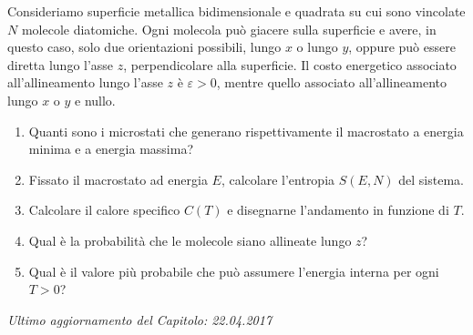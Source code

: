 \begin{Exercise}[title={Particelle diatomiche},label={ex:04-diatom}]
 Consideriamo superficie metallica bidimensionale e quadrata su cui sono vincolate $N$ molecole diatomiche. Ogni molecola può giacere sulla superficie e avere, in questo caso, solo due orientazioni possibili, lungo $x$ o lungo $y$, oppure può essere diretta lungo l'asse $z$, perpendicolare alla superficie. Il costo energetico associato all'allineamento lungo l'asse $z$ è $\varepsilon > 0$,  mentre quello associato all'allineamento lungo $x$ o $y$ e nullo.
\begin{enumerate}
	\item Quanti sono i microstati che generano rispettivamente il macrostato a energia minima e a energia massima?
	\item  Fissato il macrostato ad energia $E$, calcolare l'entropia $S(E, N )$ del sistema.
	\item Calcolare il calore specifico $C(T )$ e disegnarne l'andamento in funzione di $T$.
	\item Qual è la probabilità che le molecole siano allineate lungo $z$?
	\item Qual è il valore più probabile che può assumere l'energia interna per ogni $T>0$?
\end{enumerate}
\end{Exercise}


\vskip 0.75cm
\begin{flushright}
{\em Ultimo aggiornamento del Capitolo: 22.04.2017}
\end{flushright}
